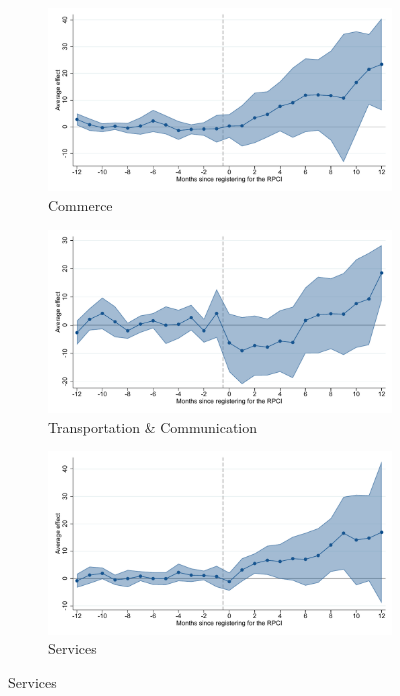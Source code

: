 \begin{figure}[H]
    \begin{subfigure}{0.32\textwidth}
    \caption{Commerce}
    \includegraphics[width=\textwidth]{04_Figures/muestra_10porciento/event_study_sal_cierre_ind_commerce_dcdh_connected.pdf}
    \end{subfigure}
    \begin{subfigure}{0.32\textwidth}
    \caption{Transportation \& Communication}
    \includegraphics[width=\textwidth]{04_Figures/muestra_10porciento/event_study_sal_cierre_ind_transport_dcdh_connected.pdf}
    \end{subfigure}
    \begin{subfigure}{0.32\textwidth}
    \caption{Services}
    \includegraphics[width=\textwidth]{04_Figures/muestra_10porciento/event_study_sal_cierre_ind_services_dcdh_connected.pdf}
    \end{subfigure}


\end{figure}
